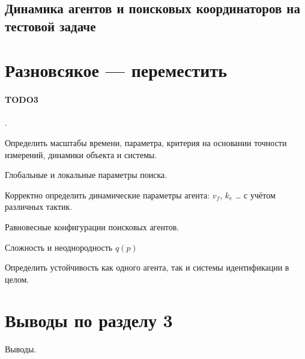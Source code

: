 
\subsection{Динамика агентов и поисковых координаторов на тестовой задаче}  %



\section{Разновсякое --- переместить}  %



\paragraph{TODO3}.

Определить масштабы времени, параметра, критерия на основании точности измерений,
динамики объекта и системы.

Глобальные и локальные параметры поиска.

Корректно определить динамические параметры агента: $v_f$, $k_e$ \ldots
с учётом различных тактик.

Равновесные конфигурации поисковых агентов.

Сложность и неоднородность $q(p)$

Определить устойчивость как одного агента, так и системы идентификации в целом.







\section{Выводы по разделу 3}  %

Выводы.


%
%
%
%
%


